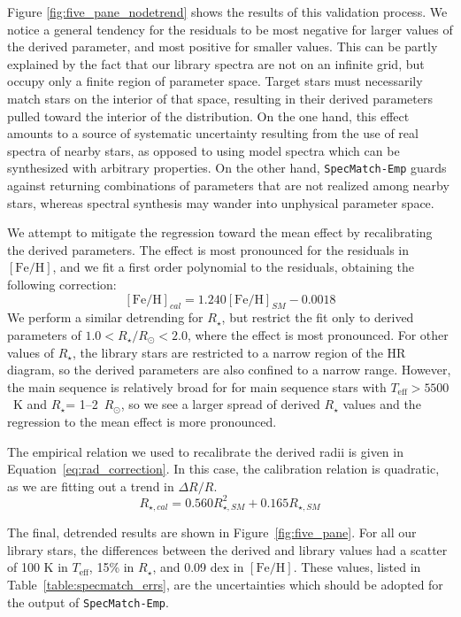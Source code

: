 \documentclass[preprint2]{aastex6}
\newcommand{\SpecMatch}{\texttt{SpecMatch-Emp}\xspace}
\newcommand{\Rstar}{\ensuremath{R_{\star}}\xspace}
\newcommand{\fe}{\ensuremath{\mathrm{[Fe/H]}}\xspace}
\newcommand{\teff}{\ensuremath{T_{\mathrm{eff}}}\xspace}
\newcommand{\Rsun}{\ensuremath{R_{\odot}}\xspace }
\newcommand{\sigteff}{100 K\xspace}
\newcommand{\sigRstar}{15\%\xspace}
\newcommand{\sigfe}{0.09 dex\xspace}
\begin{document}
Figure \ref{fig:five_pane_nodetrend} shows the results of this validation process. We notice a general tendency for the residuals to be most negative for larger values of the derived parameter, and most positive for smaller values. This can be partly explained by the fact that our library spectra are not on an infinite grid, but occupy only a finite region of parameter space. Target stars must necessarily match stars on the interior of that space, resulting in their derived parameters pulled toward the interior of the distribution. On the one hand, this effect amounts to a source of systematic uncertainty resulting from the use of real spectra of nearby stars, as opposed to using model spectra which can be synthesized with arbitrary properties. On the other hand, \SpecMatch guards against returning combinations of parameters that are not realized among nearby stars, whereas spectral synthesis may wander into unphysical parameter space.

We attempt to  mitigate the regression toward the mean effect by recalibrating the derived parameters. The effect is most pronounced for the residuals in \fe, and we fit a first order polynomial to the residuals, obtaining the following correction:
\begin{equation} 
\label{eq:fe_correction}
	\fe_{cal} = 1.240 \fe_{SM} - 0.0018
\end{equation}
We perform a similar detrending for \Rstar, but restrict the fit only to derived parameters of $1.0 < \Rstar / \Rsun < 2.0$, where the effect is most pronounced. For other values of \Rstar, the library stars are restricted to a narrow region of the HR diagram, so the derived parameters are also confined to a narrow range. However, the main sequence is relatively broad for for main sequence stars with $\teff > 5500$~K and \Rstar = 1--2~\Rsun, so we see a larger spread of derived \Rstar values and the regression to the mean effect is more pronounced.

The empirical relation we used to recalibrate the derived radii is given in Equation~\ref{eq:rad_correction}. In this case, the calibration relation is quadratic, as we are fitting out a trend in $\Delta R/R$.
\begin{equation} \label{eq:rad_correction}
	R_{\star, cal} = 0.560 R_{\star, SM}^2 + 0.165 R_{\star, SM}
\end{equation}

The final, detrended results are shown in Figure~\ref{fig:five_pane}. For all our library stars, the differences between the derived and library values had a scatter of \sigteff in \teff, \sigRstar in \Rstar, and \sigfe in \fe. These values, listed in Table~\ref{table:specmatch_errs}, are the uncertainties which should be adopted for the output of \SpecMatch.
\end{document}
